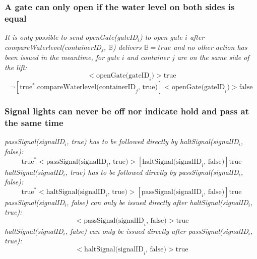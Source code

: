\subsubsection{A gate can only open if the water level on both sides is equal}
\textit{It is only possible to send openGate(gateID$_i$) to open gate $i$ after compareWaterlevel(containerID$_j$, $\mathbb{B}$) delivers $\mathbb{B} = true$ and no other action has been issued in the meantime, for gate $i$ and container $j$ are on the same side of the lift:}\\
	\begin{equation*}
		[\textrm{true}^*.\textrm{compareWaterlevel(containerID}_j \textrm{, 	true})]<\textrm{openGate(gateID}_i)>\textrm{true}
	\end{equation*}
	\begin{equation*}
		\neg[\textrm{true}^*.\textrm{compareWaterlevel(containerID}_j \textrm{, true})]<\textrm{openGate(gateID}_i)>\textrm{false}
	\end{equation*}

\subsubsection{Signal lights can never be off nor indicate hold and pass at the same time}
\textit{passSignal(signalID$_i$, true) has to be followed directly by haltSignal(signalID$_i$, false):}\\
	\begin{equation*}
		\textrm{true}^*<\textrm{passSignal(signalID}_i \textrm{, true})>[\textrm{haltSignal(signalID}_i \textrm{, 	false})]\textrm{true}
	\end{equation*}
\textit{haltSignal(signalID$_i$, true) has to be followed directly by passSignal(signalID$_i$, false):}\\
	\begin{equation*}
		\textrm{true}^*<\textrm{haltSignal(signalID}_i \textrm{, true})>[\textrm{passSignal(signalID}_i \textrm{, false})]\textrm{true}
	\end{equation*}
\textit{passSignal(signalID$_i$, false) can only be issued directly after haltSignal(signalID$_i$, true):}\\
	\begin{equation*}
		[\textrm{true}^*.\textrm{haltSignal(signalID}_i \textrm{, true})]<\textrm{passSignal(signalID}_i \textrm{, false})>\textrm{true}
	\end{equation*}
\textit{haltSignal(signalID$_i$, false) can only be issued directly after passSignal(signalID$_i$, true):}\\
	\begin{equation*}
		[\textrm{true}^*.\textrm{passSignal(signalID}_i \textrm{, true})]<\textrm{haltSignal(signalID}_i \textrm{, false})>\textrm{true}
	\end{equation*}
